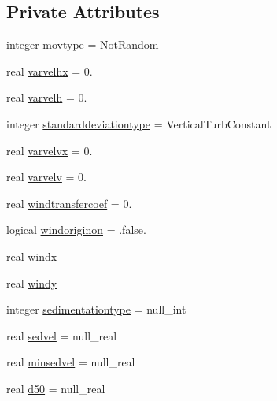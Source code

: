 \subsection*{Private Attributes}
\begin{DoxyCompactItemize}
\item 
integer \mbox{\hyperlink{structmodulelagrangian_1_1t__movement_aa1f8cd78b0d8ea4e9eb20d9ca83bf486}{movtype}} = Not\+Random\+\_\+
\item 
real \mbox{\hyperlink{structmodulelagrangian_1_1t__movement_a760a36ebadb7b0c979c3293e23a4bd63}{varvelhx}} = 0.
\item 
real \mbox{\hyperlink{structmodulelagrangian_1_1t__movement_a6d898d8b2a84e7e5e8eb4001ed5a8394}{varvelh}} = 0.
\item 
integer \mbox{\hyperlink{structmodulelagrangian_1_1t__movement_a174afa1f8641978b0d28ade75a89f55f}{standarddeviationtype}} = Vertical\+Turb\+Constant
\item 
real \mbox{\hyperlink{structmodulelagrangian_1_1t__movement_a65c5b91ff6bd55668cd66a0704898a24}{varvelvx}} = 0.
\item 
real \mbox{\hyperlink{structmodulelagrangian_1_1t__movement_a9867a99bed859923a20609daff278cf4}{varvelv}} = 0.
\item 
real \mbox{\hyperlink{structmodulelagrangian_1_1t__movement_aadb094059b3d5de26653926eb192d6e7}{windtransfercoef}} = 0.
\item 
logical \mbox{\hyperlink{structmodulelagrangian_1_1t__movement_a3ce8d9380a571823877822fa3d157bf6}{windoriginon}} = .false.
\item 
real \mbox{\hyperlink{structmodulelagrangian_1_1t__movement_abfbdbf208bc7eb3624379fdf4edc0ad8}{windx}}
\item 
real \mbox{\hyperlink{structmodulelagrangian_1_1t__movement_aa1ac141462234b6682c5b33a9f74adb7}{windy}}
\item 
integer \mbox{\hyperlink{structmodulelagrangian_1_1t__movement_a5a7fe4a7e07eeace88bb3cabcc157a02}{sedimentationtype}} = null\+\_\+int
\item 
real \mbox{\hyperlink{structmodulelagrangian_1_1t__movement_a8a7f0814154a7b6fc376ccadac126d0d}{sedvel}} = null\+\_\+real
\item 
real \mbox{\hyperlink{structmodulelagrangian_1_1t__movement_a43b53bea11b674dbb96df41ce111a118}{minsedvel}} = null\+\_\+real
\item 
real \mbox{\hyperlink{structmodulelagrangian_1_1t__movement_a3fbf9a165e4d2bbac3adfdbe9c11ea0c}{d50}} = null\+\_\+real
\item 

\end{DoxyCompactItemize}
